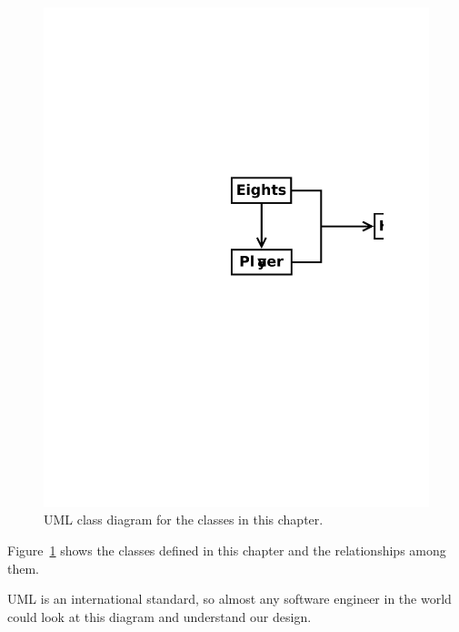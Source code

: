 \documentclass[12pt]{book}
\makeatletter
\theoremstyle{exercise}
\renewcommand{\section}{\@startsection{section}{1}{\z@}%
    {-3.5ex \@plus -1ex \@minus -.2ex}%
    {0.7ex \@plus.2ex}%
    {\normalfont\Large\bfseries}}
\makeatother
\begin{document}
\begin{figure}[!h]
\begin{center}
\includegraphics{figs/uml1.pdf}
\caption{UML class diagram for the classes in this chapter.}
\label{uml1}
\end{center}
\end{figure}


Figure~\ref{uml1} shows the classes defined in this chapter and the relationships among them.

UML is an international standard, so almost any software engineer in the world could look at this diagram and understand our design.


\end{document}
